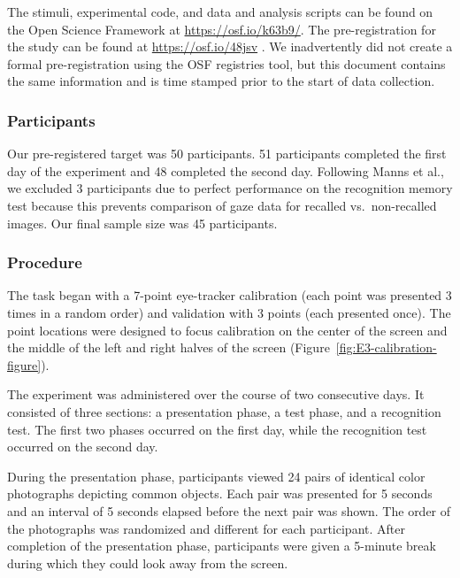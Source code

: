 \documentclass[
  man,floatsintext]{apa6}
\begin{document}
The stimuli, experimental code, and data and analysis scripts can be
found on the Open Science Framework at \url{https://osf.io/k63b9/}.
The pre-registration for the study can be
found at \url{https://osf.io/48jsv} . We
inadvertently did not create a formal pre-registration using the OSF
registries tool, but this document contains the same information and is
time stamped prior to the start of data collection.

\hypertarget{participants-3}{%
\subsubsection{Participants}\label{participants-3}}

Our pre-registered target was 50 participants. 51 participants completed
the first day of the experiment and 48 completed the second day.
Following Manns et al., we excluded 3 participants due to perfect
performance on the recognition memory test because this prevents
comparison of gaze data for recalled vs.~non-recalled images. Our final
sample size was 45 participants.

\hypertarget{procedure-2}{%
\subsubsection{Procedure}\label{procedure-2}}

The task began with a 7-point eye-tracker calibration (each point was
presented 3 times in a random order) and validation with 3 points (each
presented once). The point locations were designed to focus calibration
on the center of the screen and the middle of the left and right halves
of the screen (Figure~\ref{fig:E3-calibration-figure}).

The experiment was administered over the course of two
consecutive days. It consisted of three sections: a presentation phase,
a test phase, and a recognition test. The first two phases occurred on
the first day, while the recognition test occurred on the second day.

During the presentation phase, participants viewed 24 pairs of identical
color photographs depicting common objects. Each pair was presented for
5 seconds and an interval of 5 seconds elapsed before the next pair was
shown. The order of the photographs was randomized and different for
each participant. After completion of the presentation phase,
participants were given a 5-minute break during which they could look
away from the screen.
\end{document}
